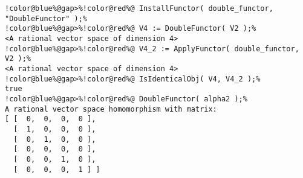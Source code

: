 \begin{Verbatim}[commandchars=!@\%,frame=single]
!color@blue%@gap>%!color@red%@ InstallFunctor( double_functor, "DoubleFunctor" );%
!color@blue%@gap>%!color@red%@ V4 := DoubleFunctor( V2 );%
<A rational vector space of dimension 4>
!color@blue%@gap>%!color@red%@ V4_2 := ApplyFunctor( double_functor, V2 );%
<A rational vector space of dimension 4>
!color@blue%@gap>%!color@red%@ IsIdenticalObj( V4, V4_2 );%
true
!color@blue%@gap>%!color@red%@ DoubleFunctor( alpha2 );%
A rational vector space homomorphism with matrix: 
[ [  0,  0,  0,  0 ],
  [  1,  0,  0,  0 ],
  [  0,  1,  0,  0 ],
  [  0,  0,  0,  0 ],
  [  0,  0,  1,  0 ],
  [  0,  0,  0,  1 ] ]
\end{Verbatim}
